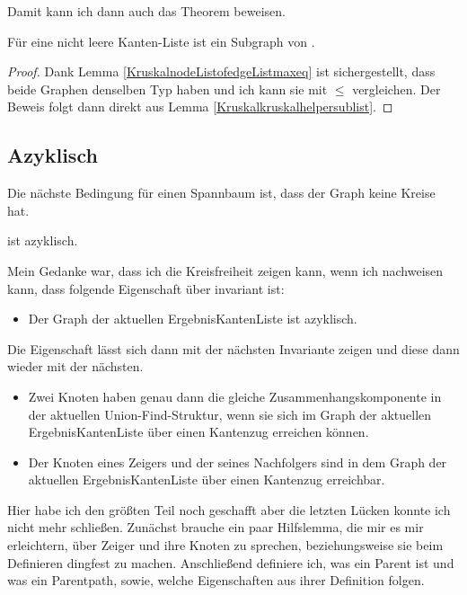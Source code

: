 Damit kann ich dann auch das Theorem beweisen.

\begin{lemma}[\KruskalSimpleGraphofkruskalIsSubgraph]\label{KruskalSimpleGraphofkruskalIsSubgraph}
  Für eine nicht leere Kanten-Liste ist \KruskalSimpleGraphofkruskal ein Subgraph von \KruskalSimpleGraphofnofedgeList.
\end{lemma}
\begin{proof}
  Dank Lemma \ref{KruskalnodeListofedgeListmaxeq} ist sichergestellt, dass beide Graphen denselben Typ haben und ich kann sie mit $\le$ vergleichen.
  Der Beweis folgt dann direkt aus Lemma \ref{Kruskalkruskalhelpersublist}.
\end{proof}

\subsection{Azyklisch}

Die nächste Bedingung für einen Spannbaum ist, dass der Graph keine Kreise hat.

\begin{theorem}
  \KruskalSimpleGraphofkruskal ist azyklisch.
\end{theorem}

Mein Gedanke war, dass ich die Kreisfreiheit zeigen kann, wenn ich nachweisen kann, dass folgende Eigenschaft über \Kruskalkruskalhelper invariant ist:
\begin{itemize}
  \item[1.] Der Graph der aktuellen ErgebnisKantenListe ist azyklisch.
\end{itemize}
Die Eigenschaft lässt sich dann mit der nächsten Invariante zeigen und diese dann wieder mit der nächsten.
\begin{itemize}
  \item[2.] Zwei Knoten haben genau dann die gleiche Zusammenhangskomponente in der aktuellen Union-Find-Struktur,
  wenn sie sich im Graph der aktuellen ErgebnisKantenListe über einen Kantenzug erreichen können.
  \item[3.] Der Knoten eines Zeigers und der seines Nachfolgers sind in dem Graph der aktuellen ErgebnisKantenListe über einen Kantenzug erreichbar.
\end{itemize}

Hier habe ich den größten Teil noch geschafft aber die letzten Lücken konnte ich nicht mehr schließen.
Zunächst brauche ein paar Hilfslemma, die mir es mir erleichtern, über Zeiger und ihre Knoten zu sprechen, beziehungsweise sie beim Definieren dingfest zu machen.
Anschließend definiere ich, was ein Parent ist und was ein Parentpath, sowie, welche Eigenschaften aus ihrer Definition folgen.

